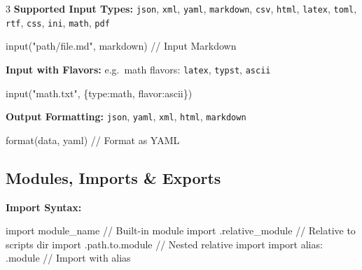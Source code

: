 \documentclass[8pt,landscape,a4paper,oneside]{article}
\newenvironment{Shaded}{%
  \begin{snugshade}%
  \vspace{0.4\baselineskip}%
  \fontsize{9}{10}\selectfont%
  \setlength{\parskip}{0pt}%
  \setlength{\topsep}{0pt}%
  \setlength{\partopsep}{0pt}%
}{%
  \vspace{0.01\baselineskip}%
  \end{snugshade}%
}
\newcommand{\NormalTok}[1]{#1}
\begin{document}
\begin{multicols*}{3}
\textbf{Supported Input Types:} \texttt{json}, \texttt{xml},
\texttt{yaml}, \texttt{markdown}, \texttt{csv}, \texttt{html},
\texttt{latex}, \texttt{toml}, \texttt{rtf}, \texttt{css}, \texttt{ini},
\texttt{math}, \texttt{pdf}

\begin{Shaded}
\begin{Highlighting}[]
\NormalTok{input("path/file.md", \textquotesingle{}markdown\textquotesingle{})   // Input Markdown}
\end{Highlighting}
\end{Shaded}

\textbf{Input with Flavors:} e.g.~math flavors: \texttt{latex},
\texttt{typst}, \texttt{ascii}

\begin{Shaded}
\begin{Highlighting}[]
\NormalTok{input("math.txt", \{\textquotesingle{}type\textquotesingle{}:\textquotesingle{}math\textquotesingle{}, \textquotesingle{}flavor\textquotesingle{}:\textquotesingle{}ascii\textquotesingle{}\})}
\end{Highlighting}
\end{Shaded}

\textbf{Output Formatting:} \texttt{json}, \texttt{yaml}, \texttt{xml},
\texttt{html}, \texttt{markdown}

\begin{Shaded}
\begin{Highlighting}[]
\NormalTok{format(data, \textquotesingle{}yaml\textquotesingle{})                // Format as YAML}
\end{Highlighting}
\end{Shaded}

\subsection{Modules, Imports \& Exports}\label{modules-imports-exports}

\textbf{Import Syntax:}

\begin{Shaded}
\begin{Highlighting}[]
\NormalTok{import module\_name          // Built{-}in module}
\NormalTok{import .relative\_module     // Relative to script\textquotesingle{}s dir}
\NormalTok{import .path.to.module      // Nested relative import}
\NormalTok{import alias: .module       // Import with alias}
\end{Highlighting}
\end{Shaded}


\end{multicols*}
\end{document}

